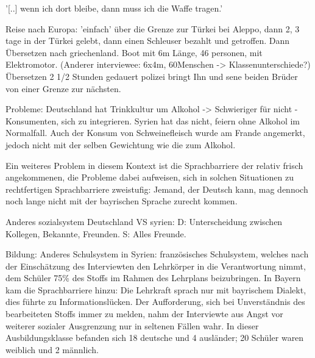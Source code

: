 \documentclass[12pt,oneside]{article}
\begin{document}
'[..] wenn ich dort bleibe, dann muss ich die Waffe tragen.'

Reise nach Europa: 'einfach' über die Grenze zur Türkei bei Aleppo, dann 2, 3 tage in der Türkei gelebt, dann einen Schleuser bezahlt und getroffen. Dann Übersetzen nach griechenland. Boot mit 6m Länge, 46 personen, mit Elektromotor. (Anderer interviewee: 6x4m, 60Menschen -> Klassenunterschiede?)
Übersetzen 2 1/2 Stunden gedauert
polizei bringt Ihn und sene beiden Brüder von einer Grenze zur nächsten. 


Probleme: 
    Deutschland hat Trinkkultur um Alkohol -> Schwieriger für nicht - Konsumenten, sich zu integrieren. Syrien hat das nicht, feiern ohne Alkohol im Normalfall.
    Auch der Konsum von Schweinefleisch wurde am Frande angemerkt, jedoch nicht mit der selben Gewichtung wie die zum Alkohol.
    
    Ein weiteres Problem in diesem Kontext ist die Sprachbarriere der relativ frisch angekommenen, die Probleme dabei aufweisen, sich in solchen Situationen zu rechtfertigen
    Sprachbarriere zweistufig: Jemand, der Deutsch kann, mag dennoch noch lange nicht mit der bayrischen Sprache zurecht kommen.
    
    Anderes sozialsystem Deutschland VS syrien: 
        D: Unterscheidung zwischen Kollegen, Bekannte, Freunden.
        S: Alles Freunde.
        
    Bildung: Anderes Schulsystem in Syrien: französisches Schulsystem, welches nach der Einschätzung des Interviewten den Lehrkörper in die Verantwortung nimmt, dem Schüler 75\% des Stoffs im Rahmen des Lehrplans beizubringen. In Bayern kam die Sprachbarriere hinzu: Die Lehrkraft sprach nur mit bayrischem Dialekt, dies führte zu Informationslücken. Der Aufforderung, sich bei Unverständnis des bearbeiteten Stoffs immer zu melden, nahm der Interviewte aus Angst vor weiterer sozialer Ausgrenzung nur in seltenen Fällen wahr.\newline
    In dieser Ausbildungsklasse befanden sich 18 deutsche und 4 ausländer; 20 Schüler waren weiblich und 2 männlich.
\end{document}
